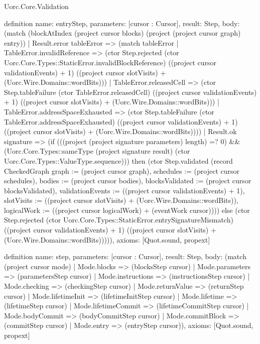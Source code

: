 \begin{lexlean}{Uorc.Core.Validation}
\begin{semanticmodule}
definition{
  name: entryStep,
  parameters: [cursor : Cursor],
  result: Step,
  body: (match (blockAtIndex (project cursor blocks) (project (project cursor graph) entry))
    | Result.error tableError => (match tableError
      | TableError.invalidReference => (ctor Step.rejected (ctor Uorc.Core.Types::StaticError.invalidBlockReference) ((project cursor validationEvents) + 1) ((project cursor slotVisits) + (Uorc.Wire.Domains::wordBits)))
      | TableError.releasedCell => (ctor Step.tableFailure (ctor TableError.releasedCell) ((project cursor validationEvents) + 1) ((project cursor slotVisits) + (Uorc.Wire.Domains::wordBits)))
      | TableError.addressSpaceExhausted => (ctor Step.tableFailure (ctor TableError.addressSpaceExhausted) ((project cursor validationEvents) + 1) ((project cursor slotVisits) + (Uorc.Wire.Domains::wordBits))))
    | Result.ok signature => (if (((project (project signature parameters) length) =? 0) && (Uorc.Core.Types::sameType (project signature result) (ctor Uorc.Core.Types::ValueType.sequence))) then (ctor Step.validated (record CheckedGraph {graph := (project cursor graph), schedules := (project cursor schedules), bodies := (project cursor bodies), blocksValidated := (project cursor blocksValidated), validationEvents := ((project cursor validationEvents) + 1), slotVisits := ((project cursor slotVisits) + (Uorc.Wire.Domains::wordBits)), logicalWork := ((project cursor logicalWork) + (eventWork cursor))})) else (ctor Step.rejected (ctor Uorc.Core.Types::StaticError.entrySignatureMismatch) ((project cursor validationEvents) + 1) ((project cursor slotVisits) + (Uorc.Wire.Domains::wordBits))))),
  axioms: [Quot.sound, propext]
}

definition{
  name: step,
  parameters: [cursor : Cursor],
  result: Step,
  body: (match (project cursor mode)
    | Mode.blocks => (blocksStep cursor)
    | Mode.parameters => (parametersStep cursor)
    | Mode.instructions => (instructionsStep cursor)
    | Mode.checking => (checkingStep cursor)
    | Mode.returnValue => (returnStep cursor)
    | Mode.lifetimeInit => (lifetimeInitStep cursor)
    | Mode.lifetime => (lifetimeStep cursor)
    | Mode.lifetimeCommit => (lifetimeCommitStep cursor)
    | Mode.bodyCommit => (bodyCommitStep cursor)
    | Mode.commitBlock => (commitStep cursor)
    | Mode.entry => (entryStep cursor)),
  axioms: [Quot.sound, propext]
}


\end{semanticmodule}
\end{lexlean}

